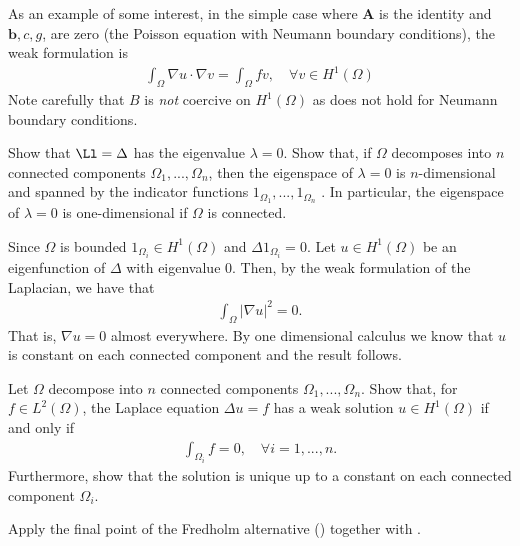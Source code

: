 \documentclass[
    a4paper,
    DIV=14,
    abstract=true,
    numbers=noenddot
]{scrartcl}
\begin{document}
As an example of some interest, in the simple case where $\bm{A}$ is the identity and $\bm{b},c, g$, are zero (the Poisson equation with Neumann boundary conditions), the weak formulation is
\begin{align*}
    \int_{\Omega } \nabla u \cdot \nabla v =\int_{\Omega } f v , \quad\forall v \in H^1(\Omega )
\end{align*}
Note carefully that $B$ is \emph{not} coercive on $H^1(\Omega )$ as  does not hold for Neumann boundary conditions.
\begin{exercise}\label{eigensapace}
    Show that $\Ll = \Delta $ has the eigenvalue $\lambda =0$. Show that, if $\Omega$ decomposes into $n$ connected components $\Omega _1,...,\Omega _n$, then the eigenspace of $\lambda =0$ is $n$-dimensional and spanned by the indicator functions $1_{\Omega_1},..., 1_{\Omega _n}$ . In particular, the eigenspace of $\lambda =0$ is one-dimensional if $\Omega $ is connected.
\end{exercise}
\begin{hint}
    Since $\Omega $ is bounded  $1_{\Omega _i} \in H^1(\Omega )$ and $\Delta 1_{\Omega_i} =0$. Let $u \in H^1(\Omega )$ be an eigenfunction of $\Delta $ with eigenvalue $0$. Then, by the weak formulation of the Laplacian, we have that
    \begin{align*}
        \int_{\Omega } |\nabla u|^2 = 0.
    \end{align*}
    That is, $\nabla u=0$ almost everywhere. By one dimensional calculus we know that $u$ is constant on each connected component and the result follows.
\end{hint}
\begin{exercise}
    Let $\Omega $ decompose into $n$ connected components $\Omega _1,...,\Omega _n$.
    Show that, for $f \in L^2(\Omega )$,  the Laplace equation $\Delta u =f$ has a weak solution $u \in H^1(\Omega )$ if and only if
    \begin{align*}
        \int_{\Omega_i } f =0, \quad \forall i=1,...,n.
    \end{align*}
    Furthermore, show that the solution is unique up to a constant on each connected component $\Omega_i $.
\end{exercise}
\begin{hint}
    Apply the final point  of the Fredholm alternative () together with .
\end{hint}


\end{document}

